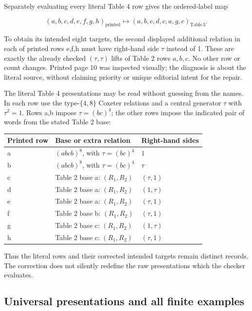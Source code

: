 Separately evaluating every literal Table 4 row gives the ordered-label map

\[
(a,b,c,d,e,f,g,h)_{\mathrm{printed}}
\longmapsto(a,b,c,d,c,a,g,c)_{\mathrm{Table\,3}}.
\tag{N2}
\]

To obtain its intended eight targets, the second displayed additional relation in each of printed rows e,f,h must have right-hand side \(\tau\) instead of 1. These are exactly the already checked \((\tau ,\tau )\) lifts of Table 2 rows \(a,b,c\). No other row or count changes. Printed page 10 was inspected visually; the diagnosis is about the literal source, without claiming priority or unique editorial intent for the repair.

The literal Table 4 presentations may be read without guessing from the names. In each row use the type-\(\{4,8\}\) Coxeter relations and a central generator \(\tau\) with \(\tau^2=1\). Rows a,b impose \(\tau=(bc)^4\); the other rows impose the indicated pair of words from the stated Table 2 base:

{\def\LTcaptype{none} %
\begin{longtable}[]{@{}lll@{}}
\toprule\noalign{}
Printed row & Base or extra relation & Right-hand sides \\
\midrule\noalign{}
\endhead
\bottomrule\noalign{}
\endlastfoot
a & \((abcb)^8\), with \(\tau=(bc)^4\) & \(1\) \\
b & \((abcb)^8\), with \(\tau=(bc)^4\) & \(\tau\) \\
c & Table 2 base a: \((R_1,R_2)\) & \((\tau,1)\) \\
d & Table 2 base a: \((R_1,R_2)\) & \((1,\tau)\) \\
e & Table 2 base a: \((R_1,R_2)\) & \((\tau,1)\) \\
f & Table 2 base b: \((R_1,R_2)\) & \((\tau,1)\) \\
g & Table 2 base c: \((R_1,R_2)\) & \((1,\tau)\) \\
h & Table 2 base c: \((R_1,R_2)\) & \((\tau,1)\) \\
\end{longtable}
}

Thus the literal rows and their corrected intended targets remain distinct records. The correction does not silently redefine the raw presentations which the checker evaluates.

\subsection{Universal presentations and all finite examples}\label{universal-presentations-and-all-finite-examples}

